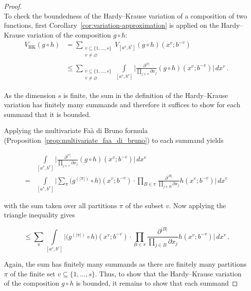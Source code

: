 \begin{proof} \ \\
To check the boundedness of the Hardy--Krause variation of a composition of two
functions, first Corollary~\ref{cor:variation-approximation} is applied on the
Hardy--Krause variation of the composition $g \circ h$:
\begin{align*}
    V_{\mathrm{HK}}(g \circ h) &= \sum_{\substack{{v \subseteq \{1,\ldots,s\}}\\{v\neq\varnothing}}} V_{[a^{v},b^{v}]}(g \circ h) (x^{v};b^{-v}) \\
    &\leq \sum_{\substack{{v \subseteq \{1,\ldots,s\}}\\{v\neq\varnothing}}} \int\limits_{[a^{v},b^{v}]} \bigg| \frac{\partial^{|v|}}{\prod_{j\in v}\partial x_j} (g \circ h)(x^{v};b^{-v}) \bigg| \, dx^{v} \,.
\end{align*}

As the dimension $s$ is finite, the sum in the definition of the Hardy--Krause
variation has finitely many summands and therefore it suffices to show for each
summand that it is bounded.

Applying the multivariate Faà di Bruno formula
(Proposition~\ref{prop:multivariate_faa_di_bruno}) to each summand yields

\begin{align*}
    &\int\limits_{[a^{v},b^{v}]} \bigg| \frac{\partial^{|v|}}{\prod_{j\in v}\partial x_j} (g \circ h)(x^{v};b^{-v}) \bigg| \, dx^{v} \\ 
    =& \int\limits_{[a^{v},b^{v}]} \bigg| \sum_{\pi} \big(g^{(|\pi|)}\circ h\big)(x^{v};b^{-v}) \cdot \prod_{B\in\pi} \frac{\partial^{|B|}}{\prod_{j\in B}\partial x_j}h(x^{v};b^{-v}) \bigg| \, dx^{v}
\end{align*}

with the sum taken over all partitions $\pi$ of the subset $v$. Now applying the triangle inequality gives

\begin{equation*}
    \leq \sum_{\pi} \int\limits_{[a^{v},b^{v}]} \bigg| \big(g^{(|\pi|)}\circ h\big)(x^{v};b^{-v}) \cdot \prod_{B\in\pi} \frac{\partial^{|B|}}{\prod_{j\in B}\partial x_j}h(x^{v};b^{-v}) \bigg| \, dx^{v} \,.
\end{equation*}

Again, the sum has finitely many summands as there are finitely many partitions
$\pi$ of the finite set $v\subseteq \{1,\ldots,s\}$. Thus, to show that the
Hardy--Krause variation of the composition $g \circ h$ is bounded, it remains to
show that each summand


\end{proof}
